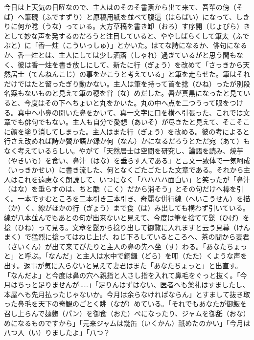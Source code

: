 \documentclass{book}
\begin{document}
今日は上天気の日曜なので、主人はのそのそ書斎から出て来て、吾輩の傍（そば）へ筆硯（ふですずり）と原稿用紙を並べて腹這（はらばい）になって、しきりに何か唸（うな）っている。大方草稿を書き卸（おろ）す序開（じょびら）きとして妙な声を発するのだろうと注目していると、ややしばらくして筆太（ふでぶと）に「香一炷（こういっしゅ）」とかいた。はてな詩になるか、俳句になるか、香一炷とは、主人にしては少し洒落（しゃれ）過ぎているがと思う間もなく、彼は香一炷を書き放しにして、新たに行（ぎょう）を改めて「さっきから天然居士（てんねんこじ）の事をかこうと考えている」と筆を走らせた。筆はそれだけではたと留ったぎり動かない。主人は筆を持って首を捻（ひね）ったが別段名案もないものと見えて筆の穂を甞（な）めだした。唇が真黒になったと見ていると、今度はその下へちょいと丸をかいた。丸の中へ点を二つうって眼をつける。真中へ小鼻の開いた鼻をかいて、真一文字に口を横へ引張った、これでは文章でも俳句でもない。主人も自分で愛想（あいそ）が尽きたと見えて、そこそこに顔を塗り消してしまった。主人はまた行（ぎょう）を改める。彼の考によると行さえ改めれば詩か賛か語か録か何（なん）かになるだろうとただ宛（あて）もなく考えているらしい。やがて「天然居士は空間を研究し、論語を読み、焼芋（やきいも）を食い、鼻汁（はな）を垂らす人である」と言文一致体で一気呵成（いっきかせい）に書き流した、何となくごたごたした文章である。それから主人はこれを遠慮なく朗読して、いつになく「ハハハハ面白い」と笑ったが「鼻汁（はな）を垂らすのは、ちと酷（こく）だから消そう」とその句だけへ棒を引く。一本ですむところを二本引き三本引き、奇麗な併行線（へいこうせん）を描（か）く、線がほかの行（ぎょう）まで食（は）み出しても構わず引いている。線が八本並んでもあとの句が出来ないと見えて、今度は筆を捨てて髭（ひげ）を捻（ひね）って見る。文章を髭から捻り出して御覧に入れますと云う見幕（けんまく）で猛烈に捻ってはねじ上げ、ねじ下ろしているところへ、茶の間から妻君（さいくん）が出て来てぴたりと主人の鼻の先へ坐（す）わる。「あなたちょっと」と呼ぶ。「なんだ」と主人は水中で銅鑼（どら）を叩（たた）くような声を出す。返事が気に入らないと見えて妻君はまた「あなたちょっと」と出直す。「なんだよ」と今度は鼻の穴へ親指と人さし指を入れて鼻毛をぐっと抜く。「今月はちっと足りませんが\ldots{}\ldots{}」「足りんはずはない、医者へも薬礼はすましたし、本屋へも先月払ったじゃないか。今月は余らなければならん」とすまして抜き取った鼻毛を天下の奇観のごとく眺（なが）めている。「それでもあなたが御飯を召し上らんで麺麭（パン）を御食（おた）べになったり、ジャムを御舐（おな）めになるものですから」「元来ジャムは幾缶（いくかん）舐めたのかい」「今月は八つ入（い）りましたよ」「八つ？ 
\end{document}
